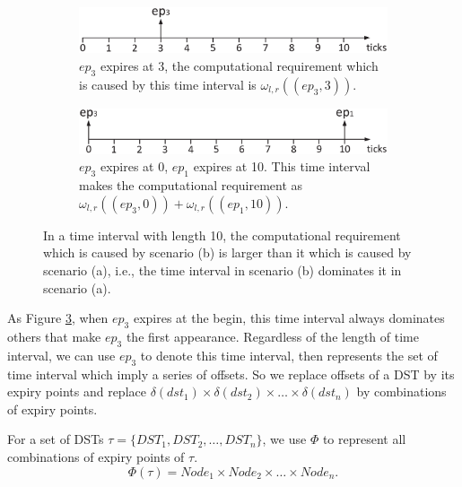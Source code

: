 \documentclass[sigconf]{acmart}
\begin{document}
\begin{figure}  
  \centering
  \begin{subfigure}[t]{3.33in}
    \centering
    \includegraphics[scale=.34]{graphics/figure_combina2.eps}
    \caption{$ep_3$ expires at 3, the computational requirement which is caused by this time interval is $\omega_{l,r}((ep_3,3)).$}\label{figure_combination1}
  \end{subfigure}
  \quad
  \begin{subfigure}[t]{3.33in}
    \centering
    \includegraphics[scale=.34]{graphics/figure_combina1.eps}
    \caption{$ep_3$ expires at 0, $ep_1$ expires at 10. This time interval makes the computational requirement as $\omega_{l,r}((ep_3,0))+\omega_{l,r}((ep_1,10))$.}\label{figure_combination2}
  \end{subfigure}
  \caption{In a time interval with length 10, the computational requirement which is caused by scenario (b) is larger than it which is caused by scenario (a), i.e., the time interval in scenario (b) dominates it in scenario (a).}\label{figure_combination}
\end{figure}
As Figure \ref{figure_combination}, when $ep_3$ expires at the begin, this time interval always dominates others that make $ep_3$ the first appearance. Regardless of the length of time interval, we can use $ep_3$ to denote this time interval, then represents the set of time interval which imply a series of offsets. So we replace offsets of a DST by its expiry points and replace $\delta(dst_1)\times\delta(dst_2)\times\dots\times\delta(dst_n)$ by combinations of expiry points.
\begin{definition}
For a set of DSTs $\tau=\{DST_1,DST_2,\dots,DST_n\}$, we use $\Phi$ to represent all combinations of expiry points of $\tau$.
\begin{equation}
  \Phi(\tau)=Node_1 \times Node_2\times\dots\times Node_n.
\end{equation}\label{equation_combination}
\end{definition}
\end{document}
